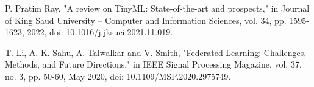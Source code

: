 \documentclass[conference]{IEEEtran}
\begin{document}

\begin{thebibliography}{00}
 P. Pratim Ray, "A review on TinyML: State-of-the-art and prospects," in Journal of King Saud University –
Computer and Information Sciences, vol. 34, pp. 1595-1623, 2022, doi: 10.1016/j.jksuci.2021.11.019.

 T. Li, A. K. Sahu, A. Talwalkar and V. Smith, "Federated Learning: Challenges, Methods, and Future Directions," in IEEE Signal Processing Magazine, vol. 37, no. 3, pp. 50-60, May 2020, doi: 10.1109/MSP.2020.2975749.
\end{thebibliography}
\vspace{12pt}
\end{document}
